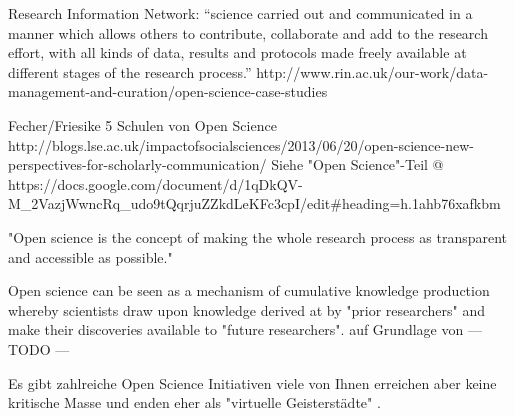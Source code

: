 Research Information Network: “science carried out and communicated in a manner which allows others to contribute, collaborate and add to the research effort, with all kinds of data, results and protocols made freely available at different stages of the research process.” http://www.rin.ac.uk/our-work/data-management-and-curation/open-science-case-studies

Fecher/Friesike 5 Schulen von Open Science http://blogs.lse.ac.uk/impactofsocialsciences/2013/06/20/open-science-new-perspectives-for-scholarly-communication/ 
Siehe "Open Science"-Teil @ https://docs.google.com/document/d/1qDkQV-M_2VazjWwncRq_udo9tQqrjuZZkdLeKFc3cpI/edit#heading=h.1ahb76xafkbm

"Open science is the concept of making the whole research process as transparent and accessible as possible."\cite{Scheliga_2014}

Open science can be seen as a mechanism of cumulative knowledge production whereby scientists draw upon knowledge derived at by "prior researchers" and make their discoveries available to "future researchers". \cite{Scheliga_2014} auf Grundlage von \cite{Mukherjee_2009}
--- TODO ---

Es gibt zahlreiche Open Science Initiativen \cite{Scheliga_2014} viele von Ihnen erreichen aber keine kritische Masse \cite{wrap_2010} und enden eher als "virtuelle Geisterstädte" \cite{Nielsen_2011}.

